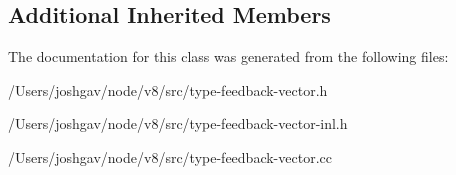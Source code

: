 \subsection*{Additional Inherited Members}


The documentation for this class was generated from the following files\+:\begin{DoxyCompactItemize}
\item 
/\+Users/joshgav/node/v8/src/type-\/feedback-\/vector.\+h\item 
/\+Users/joshgav/node/v8/src/type-\/feedback-\/vector-\/inl.\+h\item 
/\+Users/joshgav/node/v8/src/type-\/feedback-\/vector.\+cc\end{DoxyCompactItemize}
